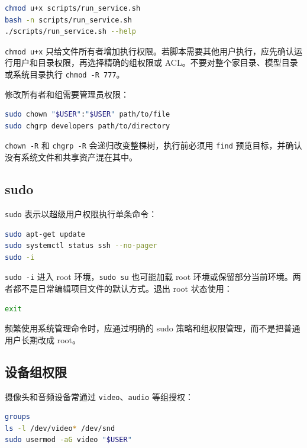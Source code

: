 \begin{lstlisting}[language=bash]
chmod u+x scripts/run_service.sh
bash -n scripts/run_service.sh
./scripts/run_service.sh --help
\end{lstlisting}

\passthrough{\lstinline!chmod u+x!}
只给文件所有者增加执行权限。若脚本需要其他用户执行，应先确认运行用户和目录权限，再选择精确的组权限或
ACL。不要对整个家目录、模型目录或系统目录执行
\passthrough{\lstinline!chmod -R 777!}。

修改所有者和组需要管理员权限：

\begin{lstlisting}[language=bash]
sudo chown "$USER":"$USER" path/to/file
sudo chgrp developers path/to/directory
\end{lstlisting}

\passthrough{\lstinline!chown -R!} 和 \passthrough{\lstinline!chgrp -R!}
会递归改变整棵树，执行前必须用 \passthrough{\lstinline!find!}
预览目标，并确认没有系统文件和共享资产混在其中。

\subsection{sudo}\label{sudo}

\passthrough{\lstinline!sudo!} 表示以超级用户权限执行单条命令：

\begin{lstlisting}[language=bash]
sudo apt-get update
sudo systemctl status ssh --no-pager
sudo -i
\end{lstlisting}

\passthrough{\lstinline!sudo -i!} 进入 root
环境，\passthrough{\lstinline!sudo su!} 也可能加载 root
环境或保留部分当前环境。两者都不是日常编辑项目文件的默认方式。退出 root
状态使用：

\begin{lstlisting}[language=bash]
exit
\end{lstlisting}

频繁使用系统管理命令时，应通过明确的 sudo
策略和组权限管理，而不是把普通用户长期改成 root。

\subsection{设备组权限}\label{ux8bbeux5907ux7ec4ux6743ux9650}

摄像头和音频设备常通过
\passthrough{\lstinline!video!}、\passthrough{\lstinline!audio!}
等组授权：

\begin{lstlisting}[language=bash]
groups
ls -l /dev/video* /dev/snd
sudo usermod -aG video "$USER"
\end{lstlisting}

